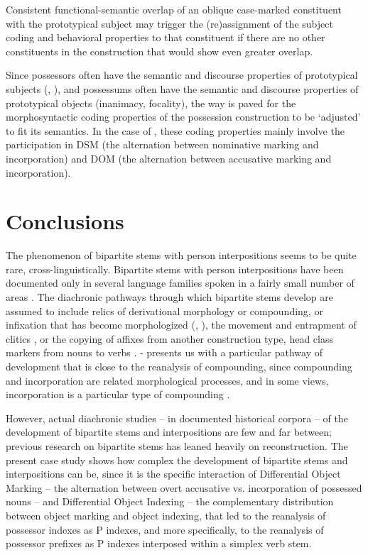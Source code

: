 \documentclass[output=paper]{LSP/langsci}
\begin{document}
\begin{modquote}
Consistent functional-semantic overlap of an oblique case-marked constituent with the prototypical subject may trigger the (re)assignment of the subject coding and behavioral properties to that constituent if there are no other constituents in the construction that would show even greater overlap.
\end{modquote}

Since possessors often have the semantic and discourse properties of prototypical subjects (\eg {}, ), and possessums often have the semantic and discourse properties of prototypical objects (\eg inanimacy, focality), the way is paved for the morphosyntactic coding properties of the possession construction to be ‘adjusted’ to fit its semantics. In the case of , these coding properties mainly involve the participation in DSM (the alternation between nominative marking and incorporation) and DOM (the alternation between accusative marking and incorporation).

\section{Conclusions}
\label{05-sec:7}

The phenomenon of bipartite stems with person interpositions seems to be quite rare, cross-linguistically. Bipartite stems with person interpositions have been documented only in several language families spoken in a fairly small number of areas \citep{Bickeletal2007Inflectional,Hildebrandt2005Himalayan}. The diachronic pathways through which bipartite stems develop are assumed to include relics of derivational morphology or compounding, or infixation that has become morphologized (\citealt[199]{Bickeletal2007Inflectional}, \citealt{DeLancey1996Penutian}), the movement and entrapment of clitics \citep{Nichols2003Bipartite}, or the copying of affixes from another construction type, \eg head class markers from nouns to verbs \citep{Nichols2003Bipartite}. - presents us with a particular pathway of development that is close to the reanalysis of compounding, since compounding and incorporation are related morphological processes, and in some views, incorporation is a particular type of compounding \citep{Mithunetal1999Effect}. 

 However, actual diachronic studies – in documented historical corpora – of the development of bipartite stems and interpositions are few and far between; previous research on bipartite stems has leaned heavily on reconstruction. The present case study shows how complex the development of bipartite stems and interpositions can be, since it is the specific interaction of Differential Object Marking – the alternation between overt accusative  vs. incorporation of possessed nouns – and Differential Object Indexing – the complementary distribution between object marking and object indexing, that led to the reanalysis of possessor indexes as P indexes, and more specifically, to the reanalysis of possessor prefixes as P indexes interposed within a simplex verb stem. 
\end{document}
